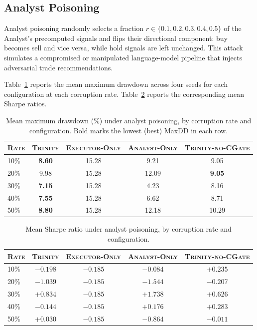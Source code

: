\subsection{Analyst Poisoning}
\label{sec:analyst-poison}

Analyst poisoning randomly selects a fraction $r \in \{0.1, 0.2, 0.3,
0.4, 0.5\}$ of the Analyst's precomputed signals and flips their
directional component: buy becomes sell and vice versa, while hold signals
are left unchanged. This attack simulates a compromised or manipulated
language-model pipeline that injects adversarial trade recommendations.

Table~\ref{tab:poison-maxdd} reports the mean maximum drawdown across
four seeds for each configuration at each corruption rate.
Table~\ref{tab:poison-sharpe} reports the corresponding mean Sharpe
ratios.

\begin{table}[h]
\centering
\caption{Mean maximum drawdown (\%) under analyst poisoning, by corruption
  rate and configuration. Bold marks the lowest (best) MaxDD in each row.}
\label{tab:poison-maxdd}
\begin{tabular}{lcccc}
\toprule
\textsc{Rate} & \textsc{Trinity} & \textsc{Executor-Only} &
  \textsc{Analyst-Only} & \textsc{Trinity-no-CGate} \\
\midrule
10\% & \textbf{8.60} & 15.28 &  9.21 &  9.05 \\
20\% & 9.98           & 15.28 & 12.09 & \textbf{9.05} \\
30\% & \textbf{7.15}  & 15.28 &  4.23 &  8.16 \\
40\% & \textbf{7.55}  & 15.28 &  6.62 &  8.71 \\
50\% & \textbf{8.80}  & 15.28 & 12.18 & 10.29 \\
\bottomrule
\end{tabular}
\end{table}

\begin{table}[h]
\centering
\caption{Mean Sharpe ratio under analyst poisoning, by corruption rate and
  configuration.}
\label{tab:poison-sharpe}
\begin{tabular}{lcccc}
\toprule
\textsc{Rate} & \textsc{Trinity} & \textsc{Executor-Only} &
  \textsc{Analyst-Only} & \textsc{Trinity-no-CGate} \\
\midrule
10\% & $-0.198$ & $-0.185$ & $-0.084$ & $+0.235$ \\
20\% & $-1.039$ & $-0.185$ & $-1.544$ & $-0.207$ \\
30\% & $+0.834$ & $-0.185$ & $+1.738$ & $+0.626$ \\
40\% & $-0.144$ & $-0.185$ & $+0.176$ & $+0.283$ \\
50\% & $+0.030$ & $-0.185$ & $-0.864$ & $-0.011$ \\
\bottomrule
\end{tabular}
\end{table}

